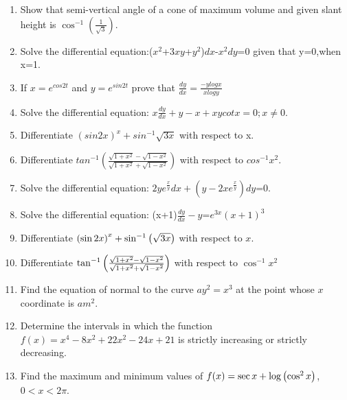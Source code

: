 \begin{enumerate}
    \item Show that semi-vertical angle of a cone of maximum volume and given slant height is $\cos^{-1}(\frac{1}{\sqrt{3}})$.
    \item Solve the differential equation:($x^{2}$+3$xy$+$y^{2}$)$dx$-$x^{2}$$dy$=0 given that y=0,when x=1.
    \item If  $ x=e^{cos2t}$ and $ y=e^{sin2t}$ prove that $\frac{dy}{dx} = \frac{-y logx}{x logy} $
    \item Solve the differential equation: $x\frac{dy}{dx}+y-x+xycotx=0; x\neq 0$.
    \item Differentiate $ (sin2x)^{x} + sin^{-1}\sqrt{3x}$ with respect to x.\\
    \item Differentiate $ tan^{-1} (\frac {\sqrt{1+x^2}-\sqrt{1-x^2}}{\sqrt{1+x^2}+\sqrt{1-x^2}})$ with respect to $cos^{-1}x^{2}$.
    \item Solve the differential equation: $ 2ye^\frac{x}{y}dx + (y-2xe^\frac{x}{y})dy$=0.
    \item  Solve the differential equation: (x+1)$\frac{dy}{dx}-y$=$e^{3x}(x+1)^3$
    \item Differentiate $\left(\sin 2x\right)^x + \sin^{-1}\left(\sqrt{3x}\right)$ with respect to $x$.
    \item Differentiate $\tan^{-1}\left(\frac{\sqrt{1 + x^{2}} - \sqrt{1 - x^{2}}}{\sqrt{1 + x^{2}} + \sqrt{1 - x^{2}}}\right)$ with respect to $\cos^{-1}x^{2}$
    \item Find the equation of normal to the curve $ay^{2} = x^{3}$ at the point whose $x$ coordinate is $am^{2}$.
    \item Determine the intervals in which the function $f(x) = x^{4} - 8x^{2} + 22x^{2} - 24x +21$ is strictly increasing or strictly decreasing.
    \item Find the maximum and minimum values of $f(x) = \sec x + \log\left(\cos^{2} x\right)$, $0 < x < 2\pi$.
\end{enumerate}
